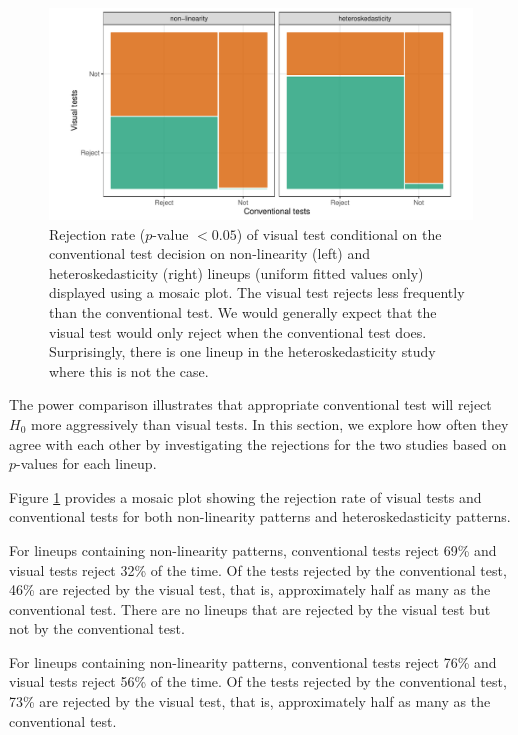 \documentclass[]{interact}
\theoremstyle{plain}%
\theoremstyle{definition}
\theoremstyle{remark}
\begin{document}
\begin{figure}

{\centering \includegraphics[width=1\linewidth]{paper_comparison_files/figure-latex/p-value-comparison-1} 

}

\caption{Rejection rate ($p$-value $<0.05$) of visual test conditional on the conventional test decision on non-linearity (left) and heteroskedasticity (right) lineups (uniform fitted values only) displayed using a mosaic plot. The visual test rejects less frequently than the conventional test. We would generally expect that the visual test would only reject when the conventional test does. Surprisingly, there is one lineup in the heteroskedasticity study where this is not the case. }\label{fig:p-value-comparison}
\end{figure}

The power comparison illustrates that appropriate conventional test will
reject \(H_0\) more aggressively than visual tests. In this section, we
explore how often they agree with each other by investigating the
rejections for the two studies based on \(p\)-values for each lineup.

Figure \ref{fig:p-value-comparison} provides a mosaic plot showing the
rejection rate of visual tests and conventional tests for both
non-linearity patterns and heteroskedasticity patterns.

For lineups containing non-linearity patterns, conventional tests reject
69\% and visual tests reject 32\% of the time. Of the tests rejected by
the conventional test, 46\% are rejected by the visual test, that is,
approximately half as many as the conventional test. There are no
lineups that are rejected by the visual test but not by the conventional
test.

For lineups containing non-linearity patterns, conventional tests reject
76\% and visual tests reject 56\% of the time. Of the tests rejected by
the conventional test, 73\% are rejected by the visual test, that is,
approximately half as many as the conventional test.
\end{document}

